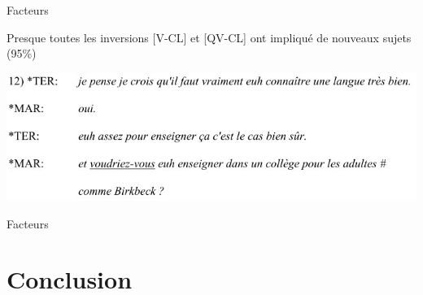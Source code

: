 \documentclass{beamer}
\begin{document}
    \begin{frame}{Facteurs}
      \begin{block}{}
        Presque toutes les inversions [V-CL] et [QV-CL] ont impliqué de nouveaux sujets (95\%)
      \end{block}
      \includegraphics[scale=0.6]{inversion.jpg}
    \end{frame}

    \begin{frame}{Facteurs}
    \end{frame}

  \section{Conclusion}
\end{document}
